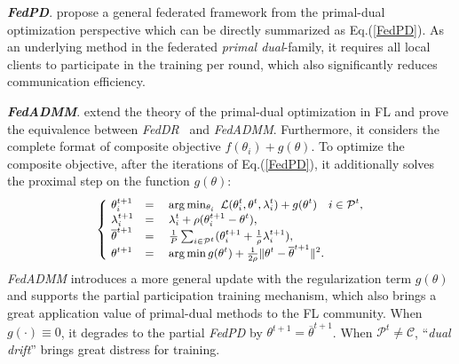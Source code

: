 \textbf{\textit{FedPD}}. \citet{zhang2021fedpd} propose a general federated framework from the primal-dual optimization perspective which can be directly summarized as Eq.(\ref{FedPD}). As an underlying method in the federated \textit{primal dual}-family, it requires all local clients to participate in the training per round, which also significantly reduces communication efficiency.

\textbf{\textit{FedADMM}}. \citet{wang2022fedadmm} extend the theory of the primal-dual optimization in FL and prove the equivalence between \textit{FedDR}~\citep{tran2021feddr} and \textit{FedADMM}. Furthermore, it considers the complete format of composite objective $f(\theta_i) + g(\theta)$. To optimize the composite objective, after the iterations of Eq.(\ref{FedPD}), it additionally solves the proximal step on the function $g(\theta)$:
\begin{eqnarray}
\label{FedADMM}
\small
\begin{cases}
\ \theta_i^{t+1} & = \quad \arg\min_{\theta_i} \ \mathcal{L} (\theta_i^t,\theta^t,\lambda_i^t) + g(\theta^t) \quad i\in\mathcal{P}^t, \\
\ \lambda_i^{t+1} & =\quad \lambda_i^{t} + \rho(\theta_i^{t+1} - \theta^t), \\
\ \overline{\theta}^{t+1} & =\quad \frac{1}{P}\sum_{i\in\mathcal{P}^t}(\theta_i^{t+1} + \frac{1}{\rho}\lambda_i^{t+1}), \\
\ \theta^{t+1} &=\quad \arg\min g(\theta^t) + \frac{1}{2\rho}\Vert \theta^t -\overline{\theta}^{t+1} \Vert^2.\\
\end{cases}
\end{eqnarray}
\textit{FedADMM} introduces a more general update with the regularization term $g(\theta)$ and supports the partial participation training mechanism, which also brings a great application value of primal-dual methods to the FL community. When $g(\cdot)\equiv 0$, it degrades to the partial \textit{FedPD} by $\theta^{t+1} = \overline{\theta}^{t+1}$. When $\mathcal{P}^t\neq\mathcal{C}$, ``\textit{dual drift}'' brings great distress for training.

